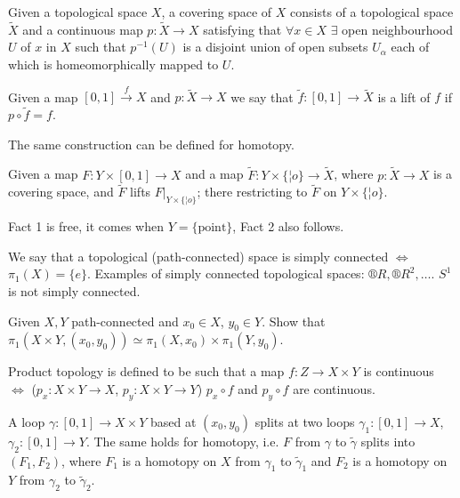 \documentclass[12pt]{article}					%
\begin{document}
\begin{definice}
	Given a topological space $X$, a covering space of $X$ consists of a topological space $\tilde X$ and a continuous map $p: \tilde X \rightarrow X$ satisfying that $\forall x \in X$ $\exists$ open neighbourhood $U$ of $x$ in $X$ such that $p^{-1}(U)$ is a disjoint union of open subsets $U_α$ each of which is homeomorphically mapped to $U$.
\end{definice}

\begin{definice}
	Given a map $[0, 1] \overset{f}\rightarrow X$ and $p: \tilde X \rightarrow X$ we say that $\tilde f:[0, 1] \rightarrow \tilde X$ is a lift of $f$ if $p ∘ \tilde f = f$.

	The same construction can be defined for homotopy.
\end{definice}

\begin{tvrzeni}[*]
	Given a map $F: Y \times [0, 1] \rightarrow X$ and a map $\tilde F: Y \times \{¦o\} \rightarrow \tilde X$, where $p: \tilde X \rightarrow X$ is a covering space, and $\tilde F$ lifts $F|_{Y \times \{¦o\}}$; there restricting to $\tilde F$ on $Y \times \{¦o\}$.

	\begin{poznamkain}
		Fact 1 is free, it comes when $Y = \{\text{point}\}$, Fact 2 also follows.
	\end{poznamkain}
\end{tvrzeni}


\begin{priklad}
	We say that a topological (path-connected) space is simply connected $\Leftrightarrow$ $π_1(X) = \{e\}$. Examples of simply connected topological spaces: $®R, ®R^2, …$. $S^1$ is not simply connected.
\end{priklad}

\begin{priklad}
	Given $X, Y$ path-connected and $x_0 \in X$, $y_0 \in Y$. Show that $π_1(X\times Y, (x_0, y_0)) \simeq π_1(X, x_0) \times π_1(Y, y_0)$.

	\begin{reseni}
		Product topology is defined to be such that a map $f: Z \rightarrow X \times Y$ is continuous $\Leftrightarrow$ ($p_x: X\times Y \rightarrow X$, $p_y: X \times Y \rightarrow Y$) $p_x ∘ f$ and $p_y ∘ f$ are continuous.

		A loop $γ: [0, 1] \rightarrow X \times Y$ based at $(x_0, y_0)$ splits at two loops $γ_1: [0, 1] \rightarrow X$, $γ_2: [0, 1] \rightarrow Y$. The same holds for homotopy, i.e. $F$ from $γ$ to $\tilde γ$ splits into $(F_1, F_2)$, where $F_1$ is a homotopy on $X$ from $γ_1$ to $\tilde γ_1$ and $F_2$ is a homotopy on $Y$ from $γ_2$ to $\tilde γ_2$.
	\end{reseni}
\end{priklad}
\end{document}
